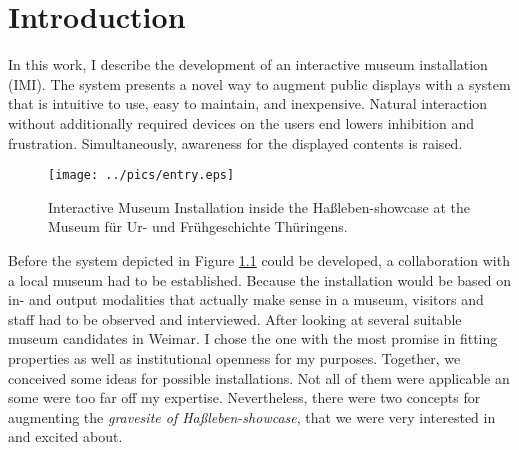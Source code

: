 \chapter{Introduction}
\label{introduction}


In this work, I describe the development of an interactive museum installation (IMI). The system presents a novel way to augment public displays with a system that is intuitive to use, easy to maintain, and inexpensive. Natural interaction without additionally required devices on the users end lowers inhibition and frustration. Simultaneously, awareness for the displayed contents is raised.

\begin{figure}[H]%
\texttt{[image: ../pics/entry.eps]}%
\caption{Interactive Museum Installation inside the Haßleben-showcase at the Museum für Ur- und Frühgeschichte Thüringens.}%
\label{fig:entry} 
\end{figure}

Before the system depicted in Figure \ref{fig:entry} could be developed, a collaboration with a local museum had to be established. Because the installation would be based on in- and output modalities that actually make sense in a museum, visitors and staff had to be observed and interviewed. After looking at several suitable museum candidates in Weimar. I chose the one with the most promise in fitting properties as well as institutional openness for my purposes. Together, we conceived some ideas for possible installations. Not all of them were applicable an some were too far off my expertise. Nevertheless, there were two concepts for augmenting the \textit{gravesite of Haßleben-showcase}, that we were very interested in and excited about.


